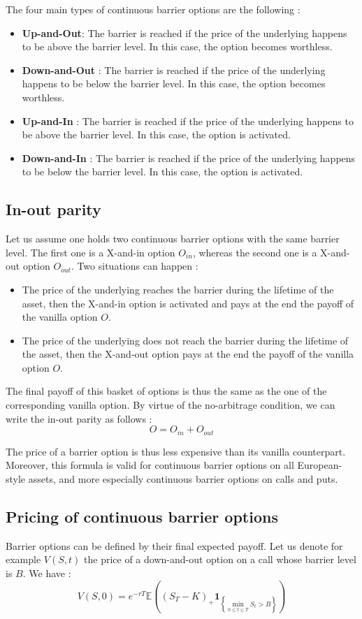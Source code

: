 \documentclass[a4paper,11pt,english]{book}
\begin{document}
The four main types of continuous barrier options are the following :
\begin{itemize}
    \item \textbf{Up-and-Out}: The barrier is reached if the price of the underlying happens to be above the barrier level. In this case, the option becomes worthless.
    \item \textbf{Down-and-Out} : The barrier is reached if the price of the underlying happens to be below the barrier level. In this case, the option becomes worthless.
    \item \textbf{Up-and-In} : The barrier is reached if the price of the underlying happens to be above the barrier level. In this case, the option is activated.
    \item \textbf{Down-and-In} : The barrier is reached if the price of the underlying happens to be below the barrier level. In this case, the option is activated.
\end{itemize}

\subsection{In-out parity}
Let us assume one holds two continuous barrier options with the same barrier level. The first one is a X-and-in option $O_{in}$, whereas the second one is a X-and-out option $O_{out}$. Two situations can happen : 
\begin{itemize}
    \item The price of the underlying reaches the barrier during the lifetime of the asset, then the X-and-in option is activated and pays at the end the payoff of the vanilla option $O$.
    \item The price of the underlying does not reach the barrier during the lifetime of the asset, then the X-and-out option pays at the end the payoff of the vanilla option $O$.
\end{itemize}

The final payoff of this basket of options is thus the same as the one of the corresponding vanilla option. By virtue of the no-arbitrage condition, we can write the in-out parity as follows : 
$$O = O_{in} + O_{out}$$

The price of a barrier option is thus less expensive than its vanilla counterpart. Moreover, this formula is valid for continuous barrier options on all European-style assets, and more especially continuous barrier options on calls and puts.

\subsection{Pricing of continuous barrier options}
Barrier options can be defined by their final expected payoff. Let us denote for example $V(S,t)$ the price of a down-and-out option on a call whose barrier level is $B$. We have : 
$$V(S,0) = e^{-rT}\mathbb{E}((S_T-K)_+\mathbf{1}_{\left\{\underset{0 \leq t \leq T}{\min} S_t>B\right\}})$$
\end{document}
